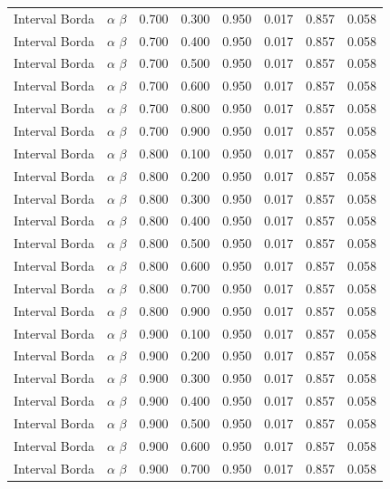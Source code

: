 \begin{longtable}{lccccccc}
Interval Borda & $\alpha$ $\beta$ & 0.700 & 0.300 & 0.950 & 0.017 & 0.857 & 0.058 \\
Interval Borda & $\alpha$ $\beta$ & 0.700 & 0.400 & 0.950 & 0.017 & 0.857 & 0.058 \\
Interval Borda & $\alpha$ $\beta$ & 0.700 & 0.500 & 0.950 & 0.017 & 0.857 & 0.058 \\
Interval Borda & $\alpha$ $\beta$ & 0.700 & 0.600 & 0.950 & 0.017 & 0.857 & 0.058 \\
Interval Borda & $\alpha$ $\beta$ & 0.700 & 0.800 & 0.950 & 0.017 & 0.857 & 0.058 \\
Interval Borda & $\alpha$ $\beta$ & 0.700 & 0.900 & 0.950 & 0.017 & 0.857 & 0.058 \\
Interval Borda & $\alpha$ $\beta$ & 0.800 & 0.100 & 0.950 & 0.017 & 0.857 & 0.058 \\
Interval Borda & $\alpha$ $\beta$ & 0.800 & 0.200 & 0.950 & 0.017 & 0.857 & 0.058 \\
Interval Borda & $\alpha$ $\beta$ & 0.800 & 0.300 & 0.950 & 0.017 & 0.857 & 0.058 \\
Interval Borda & $\alpha$ $\beta$ & 0.800 & 0.400 & 0.950 & 0.017 & 0.857 & 0.058 \\
Interval Borda & $\alpha$ $\beta$ & 0.800 & 0.500 & 0.950 & 0.017 & 0.857 & 0.058 \\
Interval Borda & $\alpha$ $\beta$ & 0.800 & 0.600 & 0.950 & 0.017 & 0.857 & 0.058 \\
Interval Borda & $\alpha$ $\beta$ & 0.800 & 0.700 & 0.950 & 0.017 & 0.857 & 0.058 \\
Interval Borda & $\alpha$ $\beta$ & 0.800 & 0.900 & 0.950 & 0.017 & 0.857 & 0.058 \\
Interval Borda & $\alpha$ $\beta$ & 0.900 & 0.100 & 0.950 & 0.017 & 0.857 & 0.058 \\
Interval Borda & $\alpha$ $\beta$ & 0.900 & 0.200 & 0.950 & 0.017 & 0.857 & 0.058 \\
Interval Borda & $\alpha$ $\beta$ & 0.900 & 0.300 & 0.950 & 0.017 & 0.857 & 0.058 \\
Interval Borda & $\alpha$ $\beta$ & 0.900 & 0.400 & 0.950 & 0.017 & 0.857 & 0.058 \\
Interval Borda & $\alpha$ $\beta$ & 0.900 & 0.500 & 0.950 & 0.017 & 0.857 & 0.058 \\
Interval Borda & $\alpha$ $\beta$ & 0.900 & 0.600 & 0.950 & 0.017 & 0.857 & 0.058 \\
Interval Borda & $\alpha$ $\beta$ & 0.900 & 0.700 & 0.950 & 0.017 & 0.857 & 0.058 \\

\end{longtable}
